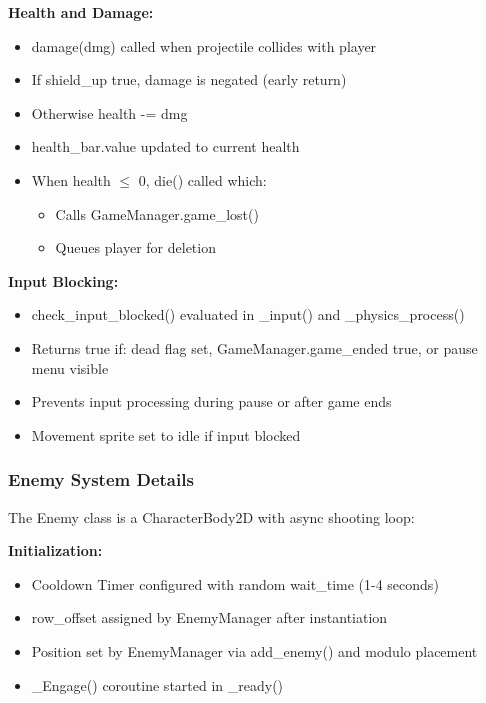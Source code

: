 \documentclass{article}
\begin{document}
\textbf{Health and Damage:}
\begin{itemize}
    \item damage(dmg) called when projectile collides with player
    \item If shield\_up true, damage is negated (early return)
    \item Otherwise health -= dmg
    \item health\_bar.value updated to current health
    \item When health $\leq$ 0, die() called which:
    \begin{itemize}
        \item Calls GameManager.game\_lost()
        \item Queues player for deletion
    \end{itemize}
\end{itemize}

\textbf{Input Blocking:}
\begin{itemize}
    \item check\_input\_blocked() evaluated in \_input() and \_physics\_process()
    \item Returns true if: dead flag set, GameManager.game\_ended true, or pause menu visible
    \item Prevents input processing during pause or after game ends
    \item Movement sprite set to idle if input blocked
\end{itemize}

\subsubsection{Enemy System Details}

The Enemy class is a CharacterBody2D with async shooting loop:

\textbf{Initialization:}
\begin{itemize}
    \item Cooldown Timer configured with random wait\_time (1-4 seconds)
    \item row\_offset assigned by EnemyManager after instantiation
    \item Position set by EnemyManager via add\_enemy() and modulo placement
    \item \_Engage() coroutine started in \_ready()
\end{itemize}
\end{document}

